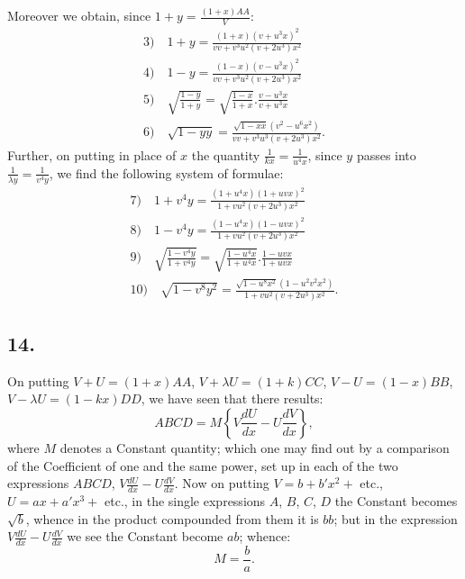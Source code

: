 \documentclass{article}
\begin{document}
Moreover we obtain, since $1+y=\frac{(1+x)AA}{V}$:
\[
\begin{gathered}
\text{3)}\quad 1+y=\frac{(1+x)(v+u^{3}x)^{2}}{vv+v^{3}u^{2}(v+2u^{3})x^{2}}\\[1.5ex]
\text{4)}\quad 1-y=\frac{(1-x)(v-u^{3}x)^{2}}{vv+v^{3}u^{2}(v+2u^{3})x^{2}}\\[1.5ex]
\text{5)}\quad \sqrt{\frac{1-y}{1+y}}=\sqrt{\frac{1-x}{1+x}}.\frac{v-u^{3}x}{v+u^{3}x}\\[1.5ex]
\text{6)}\quad \sqrt{1-yy}=\frac{\sqrt{1-xx}(v^{2}-u^{6}x^{2})}{vv+v^{3}u^{3}(v+2u^{3})x^{2}}.
\end{gathered}
\]
Further, on putting in place of $x$ the quantity $\frac{1}{kx}=\frac{1}{u^{4}x}$, since $y$ passes into $\frac{1}{\lambda y}=\frac{1}{v^{4}y}$, we find the following system of formulae:
\[
\begin{gathered}
\text{7)}\quad 1+v^{4}y=\frac{(1+u^{4}x)(1+uvx)^{2}}{1+vu^{2}(v+2u^{3})x^{2}}\\[1.5ex]
\text{8)}\quad 1-v^{4}y=\frac{(1-u^{4}x)(1-uvx)^{2}}{1+vu^{2}(v+2u^{3})x^{2}}\\[1.5ex]
\text{9)}\quad \sqrt{\frac{1-v^{4}y}{1+v^{4}y}}=\sqrt{\frac{1-u^{4}x}{1+u^{4}x}}.\frac{1-uvx}{1+uvx}\\[1.5ex]
\text{10)}\quad \sqrt{1-v^{8}y^{2}}=\frac{\sqrt{1-u^{8}x^{2}}(1-u^{2}v^{2}x^{2})}{1+vu^{2}(v+2u^{3})x^{2}}.
\end{gathered}
\]

\subsection*{14.}

On putting $V+U=(1+x)AA$, $V+\lambda U=(1+k)CC$, $V-U=(1-x)BB$, $V-\lambda U=(1-kx)DD$, we have seen that there results:
\[
ABCD=M\left\{V\frac{dU}{dx}-U\frac{dV}{dx}\right\},
\]
where $M$ denotes a Constant quantity; which one may find out by a comparison of the Coefficient of one and the same power, set up in each of the two expressions $ABCD$, $V\frac{dU}{dx}-U\frac{dV}{dx}$. Now on putting $V=b+b'x^{2}+$ etc., $U=ax+a'x^{3}+$ etc., in the single expressions $A$, $B$, $C$, $D$ the Constant becomes $\sqrt{b}$, whence in the product compounded from them it is $bb$; but in the expression $V\frac{dU}{dx}-U\frac{dV}{dx}$ we see the Constant become $ab$; whence:
\[
M=\frac{b}{a}.
\]
\end{document}

